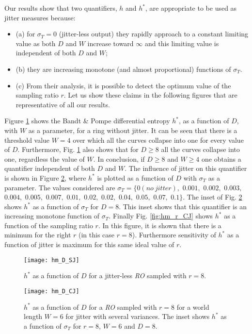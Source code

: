 Our results show that two quantifiers, $h$ and $h^*$, are appropriate to be used as jitter measures because: 
\begin{itemize} 
\item (a) for $\sigma_T=0$ (jitter-less output) they rapidly approach to a constant limiting value as both $D$ and $W$ increase toward $\infty$ and this limiting value is independent of both $D$ and $W$; 
\item (b) they are increasing monotone (and almost proportional) functions of $\sigma_T$. \item (c) From their analysis, it is possible to detect the optimum value of the sampling ratio $r$. Let us show these claims in the following figures that are representative of all our results. 
\end{itemize}
%
Figure \ref{fig:hm_D_SJ} shows the Bandt \& Pompe differential entropy $h^*$, as a function of $D$, with $W$ as a parameter, for a ring without jitter. It can be seen that there is a threshold value $W=4$ over which all the curves collapse into one for every value of $D$. Furthermore, Fig. \ref{fig:hm_D_SJ} also shows that for $D\ge8$ all the curves collapse into one, regardless the value of $W$. In conclusion, if $D\ge 8$ and $W\ge 4$ one obtains a quantifier independent of both $D$ and $W$. The influence of jitter on this quantifier is shown in Figure \ref{fig:hm_D_CJ}, where $h^*$ is plotted as a function of $D$ with $\sigma_T$ as a parameter. The values considered are $\sigma_T=\{0 (no~jitter),$ $0.001,$ $0.002,$ $0.003,$ $0.004,$ $0.005,$ $0.007,$ $0.01,$ $0.02,$ $0.02,$ $0.04,$ $0.05,$ $0.07,$ $0.1\}$. The inset of Fig. \ref{fig:hm_D_CJ} shows $h^*$ as a function of $\sigma_T$ for $D=8$. This inset shows that this quantifier is an increasing monotone function of $\sigma_T$. Finally Fig. \ref{fig:hm_r_CJ} shows $h^*$ as a function of the sampling ratio $r$. 
In this figure, it is shown that there is a minimum for the right $r$ (in this case $r=8$). Furthermore sensitivity of $h^*$ as a function of jitter is maximum for this same ideal value of $r$.

\begin{figure}
\center
\texttt{[image: hm\_D\_SJ]}
\caption{$h^*$ as a function of $D$ for a jitter-less \emph{RO} sampled with $r=8$.}
\label{fig:hm_D_SJ}
\end{figure}

\begin{figure}
\center
\texttt{[image: hm\_D\_CJ]}
\caption{$h^*$ as a function of $D$ for a \emph{RO} sampled with $r=8$ for a world length $W=6$ for jitter with several variances. The inset shows $h^*$ as a function of $\sigma_T$ for $r=8$, $W=6$ and $D=8$.}
\label{fig:hm_D_CJ}
\end{figure}

